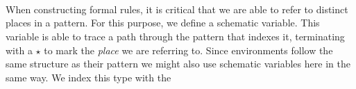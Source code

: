 \begin{code}
\>[13]\AgdaSymbol{=}%
\>[16]\<%
\\
\>[0]\AgdaSpace{}%
\AgdaSymbol{(}\AgdaSpace{}%
\AgdaSpace{}%
\AgdaSymbol{)}\AgdaSpace{}%
\AgdaSymbol{(}\AgdaSpace{}%
\AgdaSpace{}%
\AgdaSymbol{)}%
\>[25]\AgdaSymbol{=}%
\>[715I]\<%
\\
\>[715I][@{}l@{\AgdaIndent{0}}]%
\>[29]\AgdaSpace{}%
\AgdaSpace{}%
\AgdaSpace{}%
\AgdaSpace{}%
\<%
\\
%
\>[29]\AgdaSpace{}%
\AgdaSpace{}%
\AgdaSpace{}%
\AgdaSpace{}%
\<%
\\
%
\>[29]\AgdaSpace{}%
\AgdaSymbol{(}\AgdaSpace{}%
\AgdaSpace{}%
\AgdaSymbol{)}\<%
\\
\>[0]\AgdaSpace{}%
\AgdaSymbol{(}\AgdaSpace{}%
\AgdaSymbol{)}\AgdaSpace{}%
\AgdaSymbol{(}\AgdaSpace{}%
\AgdaSymbol{)}%
\>[25]\AgdaSymbol{=}%
\>[731I]\<%
\\
\>[731I][@{}l@{\AgdaIndent{0}}]%
\>[29]\AgdaSpace{}%
\AgdaSpace{}%
\AgdaSpace{}%
\AgdaSpace{}%
\<%
\\
%
\>[29]\AgdaSpace{}%
\AgdaSymbol{(}\AgdaSpace{}%
\AgdaSymbol{)}\<%
\\
\>[0]\AgdaSpace{}%
\AgdaCatchallClause{\AgdaSymbol{\AgdaUnderscore{}}}\AgdaSpace{}%
\AgdaCatchallClause{\AgdaSymbol{\AgdaUnderscore{}}}%
\>[25]\AgdaSymbol{=}\AgdaSpace{}%
\<%
\end{code}
When constructing formal rules, it is critical that we are able to refer
to distinct places in a pattern. For this purpose, we define a schematic
variable. This variable is able to trace a path through the pattern that
indexes it, terminating with a $⋆$ to mark the \emph{place} we are referring to. 
Since environments follow the same structure as their pattern we might also 
use schematic variables here in the same way. We index this type with the
